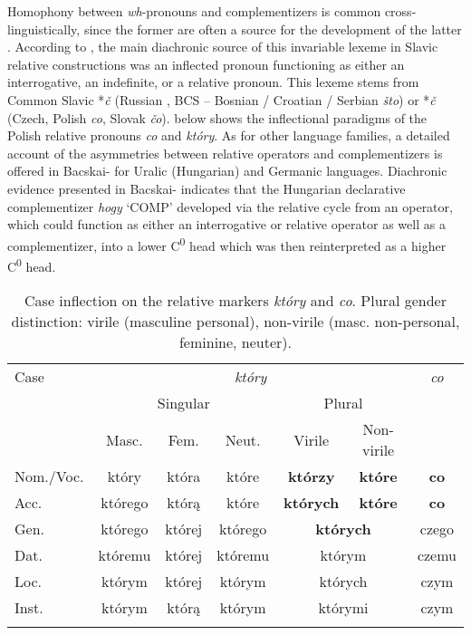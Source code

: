 \documentclass[output=paper]{langsci/langscibook}
\begin{document}
Homophony between \textit{wh}{}-pronouns and complementizers is common cross-linguistically, since the former are often a source for the development of the latter \citep[108]{Citko2004}. According to \citet{Minlos2012}, the main diachronic source of this invariable lexeme in Slavic relative constructions was an inflected pronoun functioning as either an interrogative, an indefinite, or a relative pronoun. This lexeme stems from Common Slavic *\textit{č }(Russian \textit{}, BCS – Bosnian / Croatian / Serbian \textit{što}) or *\textit{č }(Czech, Polish \textit{co}, Slovak \textit{čo}).  below shows the inflectional paradigms of the Polish relative pronouns \textit{co} and \textit{który}. As for other language families, a detailed account of the asymmetries between relative operators and complementizers is offered in Bacskai-\citet{Atkari2016} for Uralic (Hungarian) and Germanic languages. Diachronic evidence presented in Bacskai-\citet{Atkari2016} indicates that the Hungarian declarative complementizer \textit{hogy} ‘COMP’ developed via the relative cycle from an operator, which could function as either an interrogative or relative operator as well as a complementizer, into a lower C\textsuperscript{0} head which was then reinterpreted as a higher C\textsuperscript{0} head. 

\begin{table}
\caption{Case inflection on the relative markers \textit{który} and \textit{co}. Plural gender distinction: virile (masculine personal), non-virile (masc. non-personal, feminine, neuter).}
\begin{tabular}{l*{6}{c}}
\lsptoprule
Case & \multicolumn{5}{c}{\textit{który}} & \textit{co}\\\cmidrule(lr){2-6}
     & \multicolumn{3}{c}{Singular} & \multicolumn{2}{c}{Plural} & \\\cmidrule(lr){2-4}\cmidrule(lr){5-6}
     & Masc. & Fem. & Neut. & Virile & Non-virile & \\\midrule
Nom.\slash Voc. & który & która & które & \textbf{którzy} & \textbf{które} & \textbf{co}\\
Acc. & którego & którą & które & \textbf{których} & \textbf{które} & \textbf{co}\\
Gen. & którego & której & którego & \multicolumn{2}{c}{\textbf{których}} & czego\\
Dat. & któremu & której & któremu & \multicolumn{2}{c}{którym} & czemu\\
Loc. & którym & której & którym & \multicolumn{2}{c}{których} & czym\\
Inst. & którym & którą  & którym & \multicolumn{2}{c}{którymi} & czym\\
\lspbottomrule
\end{tabular}
\label{tab:leska:1}
\end{table}
\end{document}
